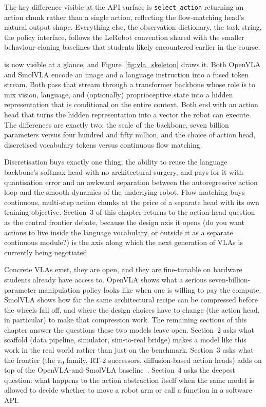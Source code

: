 The key difference visible at the API surface is \verb|select_action| returning an action chunk rather than a single action, reflecting the flow-matching head's natural output shape. Everything else, the observation dictionary, the task string, the policy interface, follows the LeRobot convention shared with the smaller behaviour-cloning baselines that students likely encountered earlier in the course.

\vspace{2.5em}

 is now visible at a glance, and Figure~\ref{fig:vla_skeleton} draws it. Both OpenVLA and SmolVLA encode an image and a language instruction into a fused token stream. Both pass that stream through a transformer backbone whose role is to mix vision, language, and (optionally) proprioceptive state into a hidden representation that is conditional on the entire context. Both end with an action head that turns the hidden representation into a vector the robot can execute. The differences are exactly two: the scale of the backbone, seven billion parameters versus four hundred and fifty million, and the choice of action head, discretised vocabulary tokens versus continuous flow matching.

 Discretisation buys exactly one thing, the ability to reuse the language backbone's softmax head with no architectural surgery, and pays for it with quantisation error and an awkward separation between the autoregressive action loop and the smooth dynamics of the underlying robot. Flow matching buys continuous, multi-step action chunks at the price of a separate head with its own training objective. Section~3 of this chapter returns to the action-head question as the central frontier debate, because the design axis it opens (do you want actions to live inside the language vocabulary, or outside it as a separate continuous module?) is the axis along which the next generation of VLAs is currently being negotiated.

\vspace{1.5em}

 Concrete VLAs exist, they are open, and they are fine-tunable on hardware students already have access to. OpenVLA shows what a serious seven-billion-parameter manipulation policy looks like when one is willing to pay the compute. SmolVLA shows how far the same architectural recipe can be compressed before the wheels fall off, and where the design choices have to change (the action head, in particular) to make that compression work. The remaining sections of this chapter answer the questions these two models leave open. Section~2 asks what scaffold (data pipeline, simulator, sim-to-real bridge) makes a model like this work in the real world rather than just on the benchmark. Section~3 asks what the frontier (the $\pi_0$ family, RT-2 successors, diffusion-based action heads) adds on top of the OpenVLA-and-SmolVLA baseline~\cite{Brohan2023RT2,Brohan2022RT1,Driess2023PaLME}. Section~4 asks the deepest question: what happens to the action abstraction itself when the same model is allowed to decide whether to move a robot arm or call a function in a software API.



